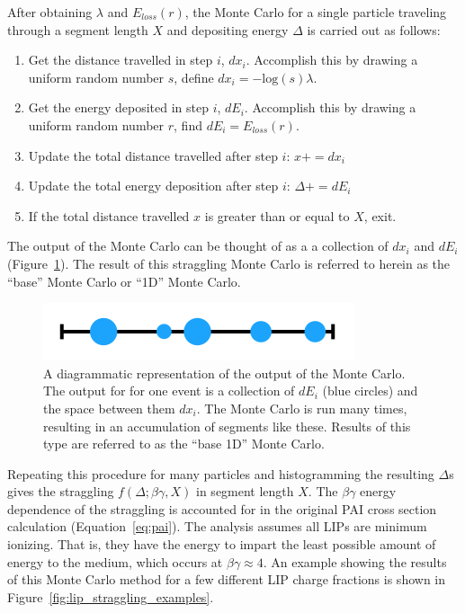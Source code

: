 After obtaining $\lambda$ and $E_{loss}(r)$, the Monte Carlo for a single particle traveling through a segment length $X$ and depositing energy $\Delta$ is carried out as follows:

\begin{enumerate}
\item Get the distance travelled in step $i$, $dx_{i}$. Accomplish this by drawing a uniform random number $s$, define $dx_{i} = -\mathrm{log}(s) \lambda$.
\item Get the energy deposited in step $i$, $dE_{i}$. Accomplish this by drawing a uniform random number $r$, find $dE_{i} = E_{loss}(r)$.
\item Update the total distance travelled after step $i$: $x += dx_{i}$
\item Update the total energy deposition after step $i$: $\Delta += dE_{i}$
\item If the total distance travelled $x$ is greater than or equal to $X$, exit.
\end{enumerate}

The output of the Monte Carlo can be thought of as a a collection of $dx_{i}$ and $dE_{i}$ (Figure~\ref{fig:dedx_diagram}). The result of this straggling Monte Carlo is referred to herein as the ``base'' Monte Carlo or ``1D'' Monte Carlo. 

 \begin{figure}[htbp]
\begin{center}
\includegraphics[width=\textwidth]{figures/lips/dedx_diagram.png}
\caption{A diagrammatic representation of the output of the Monte Carlo. The output for for one event is a collection of $dE_{i}$ (blue circles) and the space between them $dx_{i}$. The Monte Carlo is run many times, resulting in an accumulation of segments like these. Results of this type are referred to as the ``base 1D'' Monte Carlo. }
\label{fig:dedx_diagram}
\end{center}
\end{figure}


Repeating this procedure for many particles and histogramming the resulting $\Delta$s gives the straggling $f(\Delta; \beta \gamma, X)$ in segment length $X$. The $\beta \gamma$ energy dependence of the straggling is accounted for in the original \ac{PAI} cross section calculation (Equation~\ref{eq:pai}). The analysis assumes all \ac{LIP}s are minimum ionizing. That is, they have the energy to impart the least possible amount of energy to the medium, which occurs at $\beta \gamma \approx 4$. An example showing the results of this Monte Carlo method for a few different \ac{LIP} charge fractions is shown in Figure~\ref{fig:lip_straggling_examples}.
 
